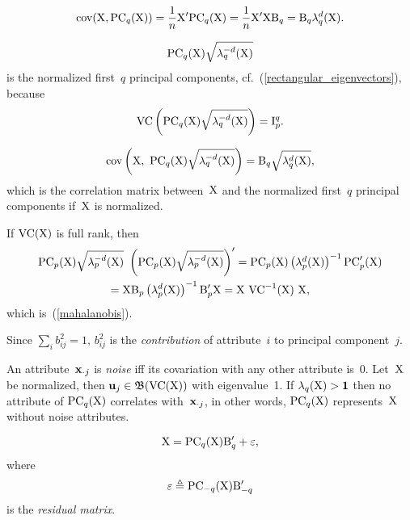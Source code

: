 \documentclass[10pt,a4paper]{article}
\theoremstyle{plain} \newtheorem{Lem}{Lemma}
\begin{document}
$$ \mathrm {cov}(\mathrm X, \mathrm {PC}_q(\mathrm X)) = \frac 1 n \mathrm X' \mathrm {PC}_q(\mathrm X) = \frac 1 n \mathrm X' \mathrm X \mathrm B_q = \mathrm B_q \mathbf \lambda_q^d(\mathrm X). $$

$$ \mathrm {PC}_q(\mathrm X) \sqrt{\mathbf \lambda_q^{-d}(\mathrm X)} $$
is the normalized first~$q$ principal components, cf.~(\ref{rectangular_eigenvectors}),
because
$$ \mathrm {VC} \left(\mathrm {PC}_q(\mathrm X) \sqrt{\mathbf \lambda_q^{-d}(\mathrm X)} \right) = \mathrm I^q_p. $$

$$ \mathrm {cov} \left(\mathrm X, \ \mathrm {PC}_q(\mathrm X) \sqrt{\mathbf \lambda_q^{-d}(\mathrm X)} \right) = \mathrm B_q \sqrt{\mathbf \lambda_q^d(\mathrm X)}, $$
which is the correlation matrix between~$\mathrm X$ and the normalized first~$q$ principal components if~$\mathrm X$ is normalized.

If $\mathrm {VC}(\mathrm X)$ is full rank, then
\begin{multline*}
$$ \PC_p(\mat X) \sqrt{\ve \lambda_p^{-d}(\mat X)} \ \left(\PC_p(\mat X) \sqrt{\ve \lambda_p^{-d}(\mat X)} \right)' 
     = \PC_p(\mat X) \left(\ve \lambda_p^d(\mat X) \right)^{-1} \PC'_p(\mat X) \\
     = \mat X \mat B_p \left(\ve \lambda_p^d(\mat X) \right)^{-1} \mat B'_p \mat X 
     = \mat X \ \VC^{-1}(\mat X) \ \mat X,
\end{multline*}
which is~(\ref{mahalanobis}).


Since $\sum_i b^2_{ij} = 1$, $b^2_{ij}$ is the {\em contribution} of attribute~$i$ to principal component~$j$.

An attribute~$\mathbf x_{\cdot j}$ is {\em noise} iff its covariation with any other attribute is~0.
Let~$\mathrm X$ be normalized,
then
$ \mathbf u_j \in \mathfrak B (\mathrm {VC}(\mathrm X)) $
with eigenvalue~1.
If $\mathbf \lambda_q(\mathrm X) > \mathbf 1$ then no attribute of $\mathrm {PC}_q(\mathrm X)$ correlates with~$\mathbf x_{\cdot j}$,
in other words, $\mathrm {PC}_q(\mathrm X)$ represents~$\mathrm X$ without noise attributes.

\begin{equation*}  \label{dataReduction}
\mathrm X = \mathrm {PC}_q(\mathrm X) \mathrm B_q' + \mathrm \varepsilon, 
\end{equation*}
where 
$$ \mathrm \varepsilon \triangleq \mathrm {PC}_{-q}(\mathrm X) \mathrm B_{-q}' $$
is the {\em residual matrix}.

\end{document}

